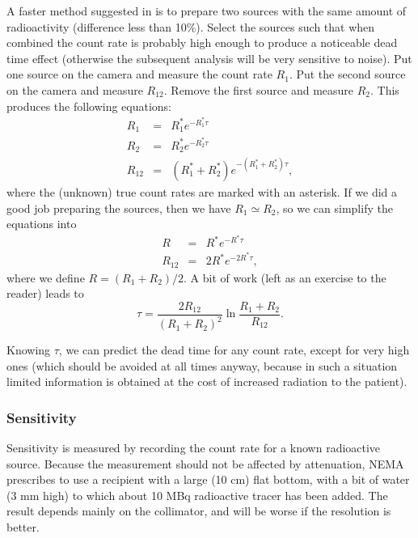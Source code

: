 A faster method suggested in \cite{Aanbevelingen} is to prepare two sources
with the same amount of radioactivity (difference less than 10\%). Select the
sources such that when combined the count rate is probably high enough to
produce a noticeable dead time effect (otherwise the subsequent analysis will
be very sensitive to noise). Put one source on the camera and measure the
count rate $R_1$. Put the second source on the camera and measure $R_{12}$.
Remove the first source and measure $R_2$. This produces the following
equations:
\begin{eqnarray}
    R_1    & = & R^\ast_1 e^{-R^\ast_1 \tau}\\
    R_2    & = & R^\ast_2 e^{-R^\ast_2 \tau}\\
    R_{12} & = & (R^\ast_1 + R^\ast_2) e^{-(R^\ast_1 + R^\ast_2) \tau},
\end{eqnarray}
where the (unknown) true count rates are marked with an asterisk. If we did a
good job preparing the sources, then we have $R_1 \simeq R_2$, so we can
simplify the equations into
\begin{eqnarray}
  R       & = & R^\ast e^{- R^\ast \tau}\\
  R_{12}  & = & 2 R^\ast e^{- 2 R^\ast \tau},
\end{eqnarray}
where we define $R = (R_1 + R_2) / 2$. A bit of work (left as an exercise
to the reader) leads to
\begin{equation}
  \tau = \frac{2 R_{12}}{(R_1 + R_2)^2} \ln \frac{R_1 + R_2}{R_{12}}.
\end{equation}

Knowing $\tau$, we can predict the dead time for any count rate, except for
very high ones (which should be avoided at all times anyway, because
in such a situation limited information is obtained at the cost of
increased radiation to the patient).

\subsubsection{Sensitivity}
Sensitivity is measured by recording the count rate for a known radioactive
source. Because the measurement should not be affected by attenuation, NEMA
prescribes to use a recipient with a large (10 cm) flat bottom, with a bit of
water (3 mm high) to which about 10 MBq radioactive tracer has been added. The
result depends mainly on the collimator, and will be worse if the resolution
is better.


